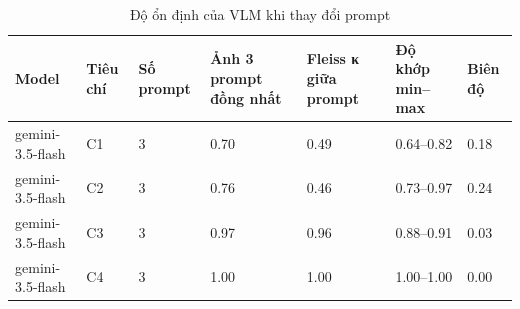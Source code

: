 \begin{table}[t]
\centering
\caption{Độ ổn định của VLM khi thay đổi prompt}
\footnotesize
\begin{tabular}{lllllll}
\hline
Model & Tiêu chí & Số prompt & Ảnh 3 prompt đồng nhất & Fleiss κ giữa prompt & Độ khớp min–max & Biên độ \\
\hline
gemini-3.5-flash & C1 & 3 & 0.70 & 0.49 & 0.64–0.82 & 0.18 \\
gemini-3.5-flash & C2 & 3 & 0.76 & 0.46 & 0.73–0.97 & 0.24 \\
gemini-3.5-flash & C3 & 3 & 0.97 & 0.96 & 0.88–0.91 & 0.03 \\
gemini-3.5-flash & C4 & 3 & 1.00 & 1.00 & 1.00–1.00 & 0.00 \\
\hline
\end{tabular}
\end{table}